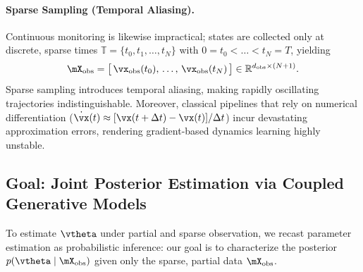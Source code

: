 \paragraph{Sparse Sampling (Temporal Aliasing).}
Continuous monitoring is likewise impractical; states are collected only at discrete, sparse times
$\mathbb{T} = \{t_0, t_1, \dots, t_N\}$ with $0 = t_0 < \dots < t_N = T$, yielding
\begin{equation}
    \mX_{\mathrm{obs}} = \big[\, \vx_{\mathrm{obs}}(t_0),\, \dots,\, \vx_{\mathrm{obs}}(t_N) \,\big]
    \in \mathbb{R}^{d_{\mathrm{obs}} \times (N+1)}.
\end{equation}
Sparse sampling introduces temporal aliasing, making rapidly oscillating trajectories
indistinguishable. Moreover, classical pipelines that rely on numerical differentiation
($\dot{\vx}(t) \approx [\vx(t+\Delta t) - \vx(t)]/\Delta t$) incur devastating approximation errors,
rendering gradient-based dynamics learning highly unstable.

\subsection{Goal: Joint Posterior Estimation via Coupled Generative Models}
To estimate $\vtheta$ under partial and sparse observation, we recast parameter estimation as
probabilistic inference: our goal is to characterize the posterior
$p(\vtheta \mid \mX_{\mathrm{obs}})$ given only the sparse, partial data $\mX_{\mathrm{obs}}$.

